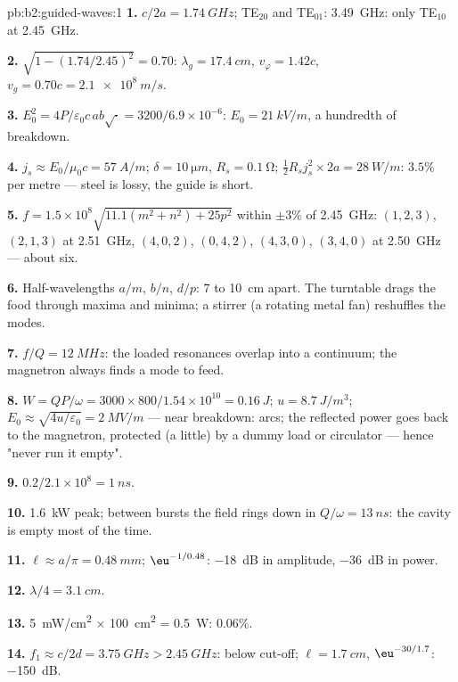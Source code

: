 \begin{solution}{pb:b2:guided-waves:1}
\textbf{1.} $c/2a = \qty{1.74}{GHz}$; TE$_{20}$ and TE$_{01}$: \qty{3.49}{GHz}: only
TE$_{10}$ at \qty{2.45}{GHz}.

\textbf{2.} $\sqrt{1 - (1.74/2.45)^2} = 0.70$: $\lambda_g = \qty{17.4}{cm}$, $v_\varphi = 1.42c$,
$v_g = 0.70c = \qty{2.1e8}{m/s}$.

\textbf{3.} $E_0^2 = 4P/\varepsilon_0c\,ab\sqrt{\cdot} = 3200/6.9 \times 10^{-6}$: $E_0 = \qty{21}{kV/m}$,
a hundredth of breakdown.

\textbf{4.} $j_s \approx E_0/\mu_0c = \qty{57}{A/m}$; $\delta = \qty{10}{\micro m}$, $R_s = \qty{0.1}{\ohm}$;
$\tfrac12R_sj_s^2 \times 2a = \qty{28}{W/m}$: $3.5\%$ per metre --- steel is lossy,
the guide is short.

\textbf{5.} $f = 1.5 \times 10^8\sqrt{11.1(m^2 + n^2) + 25p^2}$ within $\pm3\%$ of
\qty{2.45}{GHz}: $(1, 2, 3)$, $(2, 1, 3)$ at \qty{2.51}{GHz}, $(4, 0, 2)$, $(0, 4, 2)$,
$(4, 3, 0)$, $(3, 4, 0)$ at \qty{2.50}{GHz} --- about six.

\textbf{6.} Half-wavelengths $a/m$, $b/n$, $d/p$: $7$ to \qty{10}{cm} apart. The
turntable drags the food through maxima and minima; a stirrer (a
rotating metal fan) reshuffles the modes.

\textbf{7.} $f/Q = \qty{12}{MHz}$: the loaded resonances overlap into a
continuum; the magnetron always finds a mode to feed.

\textbf{8.} $W = QP/\omega = 3000 \times 800/1.54 \times 10^{10} = \qty{0.16}{J}$; $u = \qty{8.7}{J/m^3}$;
$E_0 \approx \sqrt{4u/\varepsilon_0} = \qty{2}{MV/m}$ --- near breakdown: arcs; the reflected
power goes back to the magnetron, protected (a little) by a dummy
load or circulator --- hence "never run it empty".

\textbf{9.} $0.2/2.1 \times 10^8 = \qty{1}{ns}$.

\textbf{10.} \qty{1.6}{kW} peak; between bursts the field rings down in
$Q/\omega = \qty{13}{ns}$: the cavity is empty most of the time.

\textbf{11.} $\ell \approx a/\pi = \qty{0.48}{mm}$; $\eu^{-1/0.48}$: \qty{-18}{dB} in amplitude,
\qty{-36}{dB} in power.

\textbf{12.} $\lambda/4 = \qty{3.1}{cm}$.

\textbf{13.} \qty{5}{mW/cm^2} $\times$ \qty{100}{cm^2} = \qty{0.5}{W}: $0.06\%$.

\textbf{14.} $f_1 \approx c/2d = \qty{3.75}{GHz} > \qty{2.45}{GHz}$: below cut-off; $\ell =
\qty{1.7}{cm}$, $\eu^{-30/1.7}$: \qty{-150}{dB}.


\end{solution}
